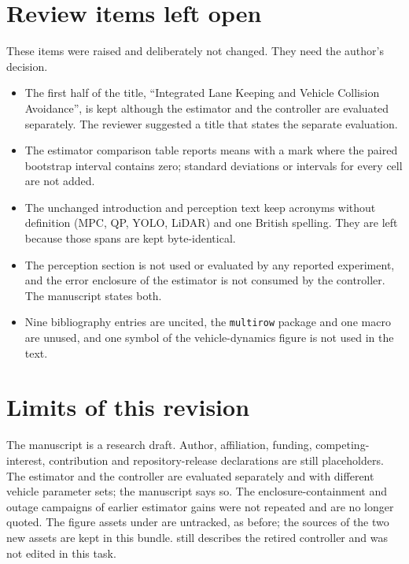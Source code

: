 \documentclass[11pt]{article}
\begin{document}
\section{Review items left open}
These items were raised and deliberately not changed. They need the
author's decision.
\begin{itemize}
\item The first half of the title, ``Integrated Lane Keeping and Vehicle
Collision Avoidance'', is kept although the estimator and the controller
are evaluated separately. The reviewer suggested a title that states the
separate evaluation.
\item The estimator comparison table reports means with a mark where the
paired bootstrap interval contains zero; standard deviations or intervals
for every cell are not added.
\item The unchanged introduction and perception text keep acronyms without
definition (MPC, QP, YOLO, LiDAR) and one British spelling. They are left
because those spans are kept byte-identical.
\item The perception section is not used or evaluated by any reported
experiment, and the error enclosure of the estimator is not consumed by the
controller. The manuscript states both.
\item Nine bibliography entries are uncited, the \texttt{multirow} package
and one macro are unused, and one symbol of the vehicle-dynamics figure is
not used in the text.
\end{itemize}

\section{Limits of this revision}
The manuscript is a research draft. Author, affiliation, funding,
competing-interest, contribution and repository-release declarations are
still placeholders. The estimator and the controller are evaluated
separately and with different vehicle parameter sets; the manuscript says
so. The enclosure-containment and outage campaigns of earlier estimator
gains were not repeated and are no longer quoted. The figure assets under
 are untracked, as before; the sources of the two new
assets are kept in this bundle.  still describes the retired
controller and was not edited in this task.
\end{document}
